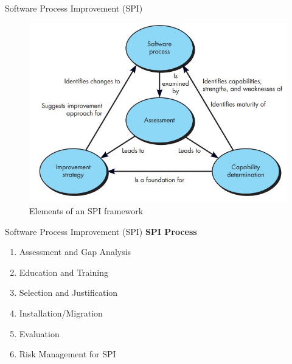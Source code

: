 \documentclass{beamer}
\begin{document}
\begin{frame}{Software Process Improvement (SPI)}
		\begin{figure}
		\includegraphics[scale=.4]{img/m5_3}
		\caption{Elements of an SPI framework }
	\end{figure}
\end{frame}
\begin{frame}{Software Process Improvement (SPI)}
\textbf{SPI Process}
\begin{enumerate}
	\item Assessment and Gap Analysis
	\item Education and Training
	\item Selection and Justification
	\item Installation/Migration
	\item Evaluation
	\item Risk Management for SPI
\end{enumerate}
	\end{frame}
\end{document}
